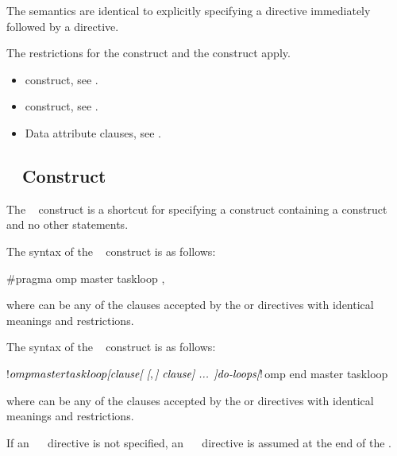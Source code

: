 \descr
The semantics are identical to explicitly specifying a  directive
immediately followed by a  directive.

\restrictions
The restrictions for the  construct and the
 construct apply.

\crossreferences
\begin{itemize}
\item {} construct, see
.

\item {} construct, see
.

\item Data attribute clauses, see
.
\end{itemize}



\subsection{~ Construct}
\label{subsec:master taskloop Construct}

\summary
The ~ construct is a shortcut for specifying a 
 construct containing a  construct and no other 
statements.

\syntax
\begin{ccppspecific}
The syntax of the ~ construct is as follows:

\begin{ompcPragma}[fontsize=\small]
#pragma omp master taskloop \plc{[clause[ [},\plc{] clause] ... ] new-line}
\end{ompcPragma}

where  can be any of the clauses accepted by the  or
 directives with identical meanings and restrictions.
\end{ccppspecific}

\begin{fortranspecific}
The syntax of the ~ construct is as follows:

\begin{ompfPragma}
!$omp master taskloop \plc{[clause[ [},\plc{] clause] ... ]}
    \plc{do-loops}
\plc{[}!$omp end master taskloop\plc{]}
\end{ompfPragma}

where  can be any of the clauses accepted by the  or
 directives with identical meanings and restrictions.

If an ~~ directive is not specified, an
~~ directive is assumed at the end of
the .
\end{fortranspecific}

